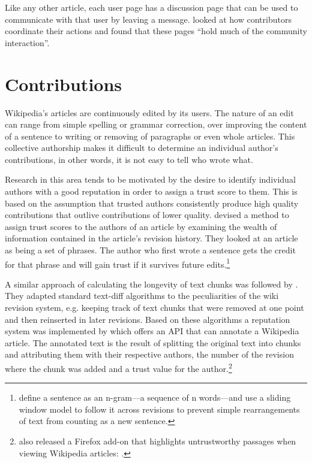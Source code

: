 Like any other article, each user page has a discussion page that can be used to communicate with that user by leaving a message.
\textcite{Viegas2007talk} looked at how contributors coordinate their actions and found that these pages ``hold much of the community interaction''.


\section{Contributions}\label{sec:contribution}

Wikipedia's articles are continuously edited by its users.
The nature of an edit can range from simple spelling or grammar correction, over improving the content of a sentence to writing or removing of paragraphs or even whole articles. 
This collective authorship makes it difficult to determine an individual author's contributions, in other words, it is not easy to tell who wrote what.

Research in this area tends to be motivated by the desire to identify individual authors with a good reputation in order to assign a trust score to them.
This is based on the assumption that trusted authors consistently produce high quality contributions that outlive contributions of lower quality.
\textcite{kramer2008wiki} devised a method to assign trust scores to the authors of an article by examining the wealth of information contained in the article's revision history.
They looked at an article as being a set of phrases.
The author who first wrote a sentence gets the credit for that phrase and will gain trust if it survives future edits.\footnote{\textcite{kramer2008wiki} define a sentence as an n-gram---a sequence of n words---and use a sliding window model to follow it across revisions to prevent simple rearrangements of text from counting as a new sentence.}

A similar approach of calculating the longevity of text chunks was followed by \textcite{adler2007content}.
They adapted standard text-diff algorithms to the peculiarities of the wiki revision system, e.g. keeping track of text chunks that were removed at one point and then reinserted in later revisions.
Based on these algorithms a reputation system was implemented by \textcite{adler2008assigning} which offers an \ac{API} that can annotate a Wikipedia article.
The annotated text is the result of splitting the original text into chunks and attributing them with their respective authors, the number of the revision where the chunk was added and a trust value for the author.\footnote{\citeauthor{adler2008assigning} also released a Firefox add-on that highlights untrustworthy passages when viewing Wikipedia articles: .}


